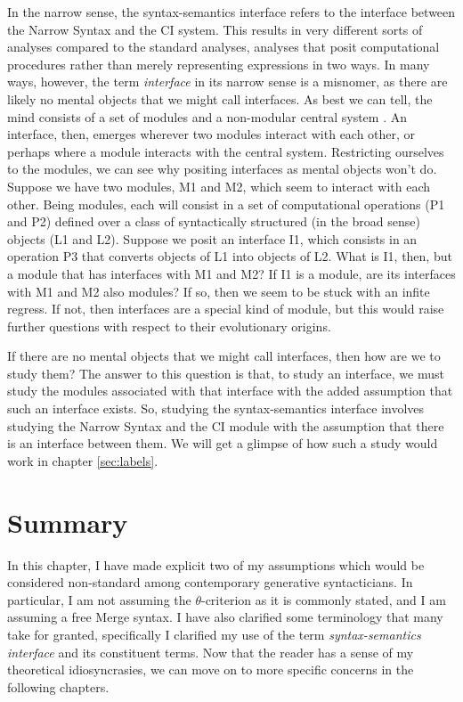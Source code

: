 \documentclass[MilwayThesis]{subfiles}
\begin{document}
In the narrow sense, the syntax-semantics interface refers to the interface between the Narrow Syntax and the CI system.
This results in very different sorts of analyses compared to the standard analyses, analyses that posit computational procedures rather than merely representing expressions in two ways.
In many ways, however, the term \textit{interface} in its narrow sense is a misnomer, as there are likely no mental objects that we might call interfaces.
As best we can tell, the mind consists of a set of modules and a non-modular central system \parencite{fodor1983modularity,fodor2001mind}.
An interface, then, emerges wherever two modules interact with each other, or perhaps where a module interacts with the central system.
Restricting ourselves to the modules, we can see why positing interfaces as mental objects won't do.
Suppose we have two modules, M1 and M2, which seem to interact with each other.
Being modules, each will consist in a set of computational operations (P1 and P2) defined over a class of syntactically structured (in the broad sense) objects (L1 and L2).
Suppose we posit an interface I1, which consists in an operation P3 that converts objects of L1 into objects of L2.
What is I1, then, but a module that has interfaces with M1 and M2?
If I1 is a module, are its interfaces with M1 and M2 also modules?
If so, then we seem to be stuck with an infite regress.
If not, then interfaces are a special kind of module, but this would raise further questions with respect to their evolutionary origins.

If there are no mental objects that we might call interfaces, then how are we to study them?
The answer to this question is that, to study an interface, we must study the modules associated with that interface with the added assumption that such an interface exists.
So, studying the syntax-semantics interface involves studying the Narrow Syntax and the CI module with the assumption that there is an interface between them.
We will get a glimpse of how such a study would work in chapter \ref{sec:labels}.

\section{Summary}
In this chapter, I have made explicit two of my assumptions which would be considered non-standard among contemporary generative syntacticians.
In particular, I am not assuming the $\theta$-criterion as it is commonly stated, and I am assuming a free Merge syntax.
I have also clarified some terminology that many take for granted, specifically I clarified my use of the term \textit{syntax-semantics interface} and its constituent terms.
Now that the reader has a sense of my theoretical idiosyncrasies, we can move on to more specific concerns in the following chapters.
\end{document}
